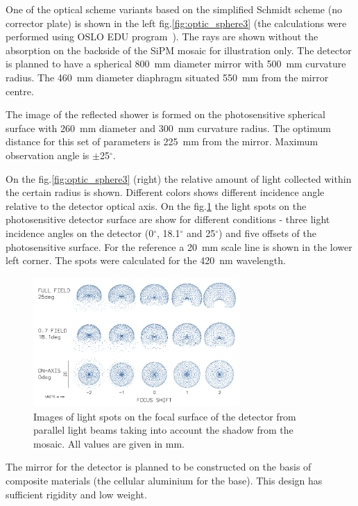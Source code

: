 \documentclass[a4paper,11pt]{article}
\begin{document}
One of the optical scheme variants based on the simplified Schmidt scheme (no corrector plate) is shown in the left fig.\ref{fig:optic_sphere3} (the calculations were performed using OSLO EDU program~\cite{Oslo}). The rays are shown without the absorption on the backside of the SiPM mosaic for illustration only. The detector is planned to have a spherical 800~mm diameter mirror with 500~mm curvature radius. The 460~mm diameter diaphragm situated 550~mm from the mirror centre.

The image of the reflected shower is formed on the photosensitive spherical surface with 260~mm diameter and 300~mm curvature radius. The optimum distance for this set of parameters is 225~mm from the mirror. Maximum observation angle is $\pm$25$^\circ$.

On the fig.\ref{fig:optic_sphere3} (right) the relative amount of light collected within the certain radius is shown. Different colors shows different incidence angle relative to the detector optical axis.
On the fig.\ref{fig:spots} the light spots on the photosensitive detector surface are show for different conditions - three light incidence angles on the detector (0$^\circ$, 18.1$^\circ$ and 25$^\circ$) and five offsets of the photosensitive surface. For the reference a 20~mm scale line is shown in the lower left corner. The spots were calculated for the 420~nm wavelength.

\begin{figure}[bt]
\centering
\includegraphics[width=0.7\textwidth]{Sphere3spot.pdf}
\caption{Images of light spots on the focal surface of the detector from parallel light beams taking into account the shadow from the mosaic. All values are given in mm.}
\label{fig:spots}
\end{figure}    

The mirror for the detector is planned to be constructed on the basis of composite materials (the cellular aluminium for the base). This design has sufficient rigidity and low weight.
\end{document}
